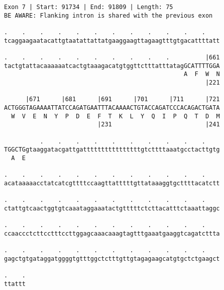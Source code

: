 \documentclass{article}
\begin{document}
\begin{Verbatim}[fontfamily=courier]
Exon 7 | Start: 91734 | End: 91809 | Length: 75
BE AWARE: Flanking intron is shared with the previous exon

.    .    .    .    .    .    .    .    .    .    .    .    
tcaggaagaatacattgtaatattattatgaaggaagttagaagtttgtgacattttatt

.    .    .    .    .    .    .    .    .    .          |661
tactgtattacaaaaaatcactgtaaagacatgtggttctttatttatagGCATTTTGGA
                                                  A  F  W  N
                                                        |221

      |671      |681      |691      |701      |711      |721
ACTGGGTAGAAAATTATCCAGATGAATTTACAAAACTGTACCAGATCCCACAGACTGATA
  W  V  E  N  Y  P  D  E  F  T  K  L  Y  Q  I  P  Q  T  D  M
                          |231                          |241

          .    .    .    .    .    .    .    .    .    .    
TGGCTGgtaaggatacgattgattttttttttttttttgtcttttaaatgcctacttgtg
  A  E                                                      

.    .    .    .    .    .    .    .    .    .    .    .    
acataaaaacctatcatcgttttccaagttatttttgttataaaggtgcttttacatctt

.    .    .    .    .    .    .    .    .    .    .    .    
ctattgtcaactggtgtcaaataggaaatactgtttttctcttacatttctaaattaggc

.    .    .    .    .    .    .    .    .    .    .    .    
ccaaccctcttcctttccttggagcaaacaaagtagtttgaaatgaaggtcagatcttta

.    .    .    .    .    .    .    .    .    .    .    .    
gagctgtgataggatggggtgtttggctctttgttgtagagaagcatgtgctctgaagct

.    .
ttattt
\end{Verbatim}
\newpage
\end{document}
